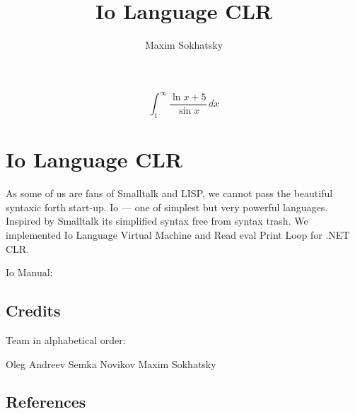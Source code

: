 \documentclass[11pt]{article}
\begin{document}


\title{Io Language CLR}
\author{Maxim Sokhatsky}

\paragraph{}
\paragraph{}
\begin{displaymath}
\int_1^\infty{\frac{\ln{x}+5}{\sin{x}}}\,dx
\end{displaymath}
\section*{Io Language CLR}

As some of us are fans of Smalltalk and LISP, we cannot pass the 
beautiful syntaxic forth start-up. Io --- one of simplest but very powerful
languages. Inspired by Smalltalk its simplified syntax free from
syntax trash. We implemented Io Language Virtual Machine and Read
eval Print Loop for .NET CLR.

Io Manual: 

\subsection*{Credits}

Team in alphabetical order:

Oleg Andreev \@br
Semka Novikov \@br
Maxim Sokhatsky                                                                                                   

\subsection*{References}
\end{document}

